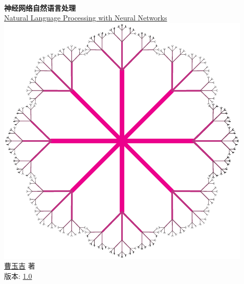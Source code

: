 \documentclass[twoside,a4paper,12pt]{book}%
\begin{document}
\begin{titlepage}
	\begin{center}
		\hfill\\
		\vspace{1cm}
		{\fontsize{36pt}{44pt}\bfseries 神经网络自然语言处理}\\
		\vspace{1em}
		{\LARGE\href{http://neuralnetworksanddeeplearning.com/index.html}{Natural Language Processing with Neural Networks}}\\
		\vspace{1cm}
		\includegraphics{cayley}\\
		\vspace{1cm}
		{\LARGE \href{http://michaelnielsen.org/}{曹玉吉} 著}\\
		\vspace{1cm}
		\vfill
		\vfill
		\vfill
		\vspace{1em}
		{\large 版本: \href{https://github.com/zhanggyb/nndl/releases/tag/0.5}{1.0}}
	\end{center}
\end{titlepage}
\end{document}
